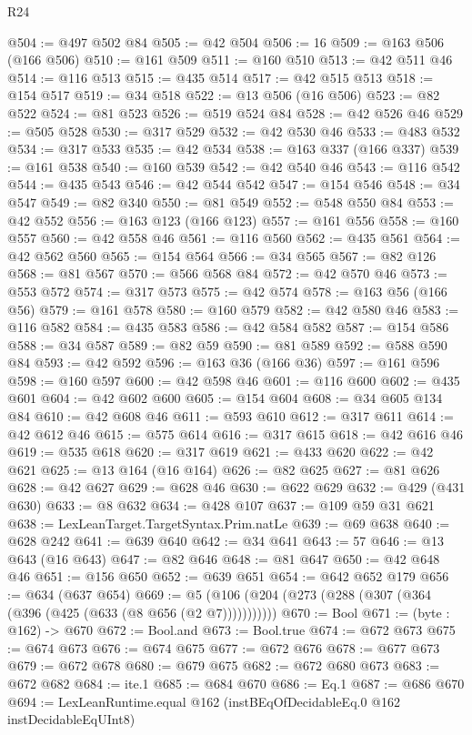 \begin{lexlean}{R24}
\begin{coremodule}
@504 := @497 @502 @84
@505 := @42 @504
@506 := 16
@509 := @163 @506 (@166 @506)
@510 := @161 @509
@511 := @160 @510
@513 := @42 @511 @46
@514 := @116 @513
@515 := @435 @514
@517 := @42 @515 @513
@518 := @154 @517
@519 := @34 @518
@522 := @13 @506 (@16 @506)
@523 := @82 @522
@524 := @81 @523
@526 := @519 @524 @84
@528 := @42 @526 @46
@529 := @505 @528
@530 := @317 @529
@532 := @42 @530 @46
@533 := @483 @532
@534 := @317 @533
@535 := @42 @534
@538 := @163 @337 (@166 @337)
@539 := @161 @538
@540 := @160 @539
@542 := @42 @540 @46
@543 := @116 @542
@544 := @435 @543
@546 := @42 @544 @542
@547 := @154 @546
@548 := @34 @547
@549 := @82 @340
@550 := @81 @549
@552 := @548 @550 @84
@553 := @42 @552
@556 := @163 @123 (@166 @123)
@557 := @161 @556
@558 := @160 @557
@560 := @42 @558 @46
@561 := @116 @560
@562 := @435 @561
@564 := @42 @562 @560
@565 := @154 @564
@566 := @34 @565
@567 := @82 @126
@568 := @81 @567
@570 := @566 @568 @84
@572 := @42 @570 @46
@573 := @553 @572
@574 := @317 @573
@575 := @42 @574
@578 := @163 @56 (@166 @56)
@579 := @161 @578
@580 := @160 @579
@582 := @42 @580 @46
@583 := @116 @582
@584 := @435 @583
@586 := @42 @584 @582
@587 := @154 @586
@588 := @34 @587
@589 := @82 @59
@590 := @81 @589
@592 := @588 @590 @84
@593 := @42 @592
@596 := @163 @36 (@166 @36)
@597 := @161 @596
@598 := @160 @597
@600 := @42 @598 @46
@601 := @116 @600
@602 := @435 @601
@604 := @42 @602 @600
@605 := @154 @604
@608 := @34 @605 @134 @84
@610 := @42 @608 @46
@611 := @593 @610
@612 := @317 @611
@614 := @42 @612 @46
@615 := @575 @614
@616 := @317 @615
@618 := @42 @616 @46
@619 := @535 @618
@620 := @317 @619
@621 := @433 @620
@622 := @42 @621
@625 := @13 @164 (@16 @164)
@626 := @82 @625
@627 := @81 @626
@628 := @42 @627
@629 := @628 @46
@630 := @622 @629
@632 := @429 (@431 @630)
@633 := @8 @632
@634 := @428 @107
@637 := @109 @59 @31 @621
@638 := LexLeanTarget.TargetSyntax.Prim.natLe
@639 := @69 @638
@640 := @628 @242
@641 := @639 @640
@642 := @34 @641
@643 := 57
@646 := @13 @643 (@16 @643)
@647 := @82 @646
@648 := @81 @647
@650 := @42 @648 @46
@651 := @156 @650
@652 := @639 @651
@654 := @642 @652 @179
@656 := @634 (@637 @654)
@669 := @5 (@106 (@204 (@273 (@288 (@307 (@364 (@396 (@425 (@633 (@8 @656 (@2 @7)))))))))))
@670 := Bool
@671 := (byte : @162) -> @670
@672 := Bool.and
@673 := Bool.true
@674 := @672 @673
@675 := @674 @673
@676 := @674 @675
@677 := @672 @676
@678 := @677 @673
@679 := @672 @678
@680 := @679 @675
@682 := @672 @680 @673
@683 := @672 @682
@684 := ite.{1}
@685 := @684 @670
@686 := Eq.{1}
@687 := @686 @670
@694 := LexLeanRuntime.equal @162 (instBEqOfDecidableEq.{0} @162 instDecidableEqUInt8)

\end{coremodule}
\end{lexlean}
